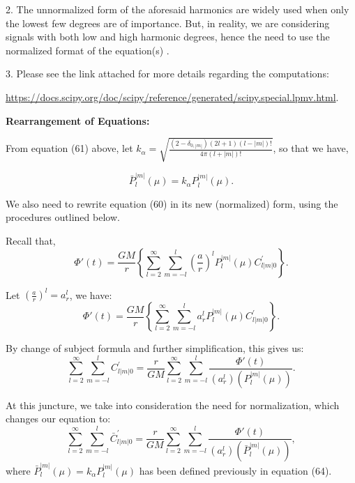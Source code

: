 \documentclass{article}
\begin{document}
2. The unnormalized form of the aforesaid harmonics are widely used when only the lowest few degrees are of importance. But, in reality, we are considering signals with both low and high harmonic degrees, hence the need to use the normalized format of the equation(s) \cite{https://doi.org/10.1029/2018GC007529}. 

3. Please see the link attached for more details regarding the computations: 

\href{https://docs.scipy.org/doc/scipy/reference/generated/scipy.special.lpmv.html}{https://docs.scipy.org/doc/scipy/reference/generated/scipy.special.lpmv.html}.

\vspace{3pt}

\textbf{Rearrangement of Equations:}

\vspace{3pt}

From equation (61) above, let $k_{\alpha} = \sqrt{\frac{{(2-\delta_{0,|m|})(2l+1)(l-|m|)!}}{{4\pi (l+|m|)!}}}$, so that we have, 

\begin{equation}
    \bar{P}_{l}^{|m|} (\mu) = k_{\alpha} P^{|m|}_{l} (\mu).
\end{equation}

We also need to rewrite equation (60) in its new (normalized) form, using the procedures outlined below.

Recall that,
\begin{equation}
\Phi{'}(t) = \frac{GM}{r}\left\{\sum_{l=2}^{\infty}\sum_{m=-l}^{l}\left(\frac{a}{r}\right)^{l}P_{l}^{|m|}(\mu)C_{l|m|0}^{'}\right\}.
\end{equation}

Let $(\frac{a}{r})^{l} = a_{r}^{l}$, we have: 
\begin{equation}
\Phi{'}(t) = \frac{GM}{r}\left\{\sum_{l=2}^{\infty}\sum_{m=-l}^{l}a_{r}^{l}P_{l}^{|m|}(\mu)C_{l|m|0}^{'}\right\}.
\end{equation}

By change of subject formula and further simplification, this gives us: 
\begin{equation}
\sum_{l=2}^{\infty}\sum_{m=-l}^{l}C_{l|m|0}^{'} =\frac{r}{GM} \sum_{l=2}^{\infty}\sum_{m=-l}^{l}\frac{\Phi{'}(t)}{(a_{r}^{l})(P_{l}^{|m|}(\mu))}.
\end{equation}

At this juncture, we take into consideration the need for normalization, which changes our equation to:
\begin{equation}
\sum_{l=2}^{\infty}\sum_{m=-l}^{l}\bar{C}_{l|m|0}^{'} =\frac{r}{GM} \sum_{l=2}^{\infty}\sum_{m=-l}^{l}\frac{\Phi{'}(t)}{(a_{r}^{l})(\bar{P}_{l}^{|m|}(\mu))},
\end{equation}
where $\bar{P}_{l}^{|m|} (\mu) = k_{\alpha} P^{|m|}_{l} (\mu)$ has been defined previously in equation (64). 
\end{document}
